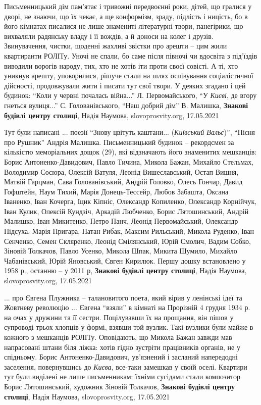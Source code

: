 Письменницький дім пам’ятає і тривожні передвоєнні роки, дітей, що гралися у
дворі, не знаючи, що їх чекає, а ще конформізм, зраду, підлість і ницість, бо в
його кімнатах писалися не лише знамениті літературні твори, панегірики, що
вихваляли радянську владу і її вождів, а й доноси на колег і друзів.
Звинувачення, чистки, щоденні жахливі звістки про арешти – цим жили квартиранти
РОЛІТу. Уночі не спали, бо саме після півночі чи вдосвіта з під’їздів виводили
ворогів народу, тих, хто не хотів іти проти своєї совісті. А ті, хто уникнув
арешту, упокорилися, рішуче стали на шлях оспівування соціалістичної дійсності,
продовжували жити і писати тут свої твори. У деяких згадано і цей будинок:
\enquote{Коли у червні почалась війна...} Л. Первомайського, \enquote{У \emph{Києві}, де
вгору гнеться вулиця...} С. Голованівського, \enquote{Наш добрий дім} В.
Малишка,
\textbf{Знакові будівлі центру столиці}, Надія Наумова, slovoprosvity.org, 17.05.2021

Тут були написані ... поезії \enquote{Знову цвітуть каштани... (\emph{Київський Вальс})},
\enquote{Пісня про Рушник} Андрія Малишка.  Письменницький будинок – рекордсмен
за кількістю меморіальних дощок (29), які відзначають його знаменитих
мешканців: Борис Антоненко-Давидович, Павло Тичина, Микола Бажан, Михайло
Стельмах, Володимир Сосюра, Олексій Ватуля, Леонід Вишеславський, Остап Вишня,
Матвій Гарцман, Сава Голованівський, Андрій Головко, Олесь Гончар, Давид
Гофштейн, Наум Тихий, Марія Донець-Тессейр, Любов Забашта, Оксана Іваненко,
Іван Кочерга, Іцик Кіпніс, Олександр Копиленко, Олександр Корнійчук, Іван
Кулик, Олексій Кундзіч, Аркадій Любченко, Борис Лятошинський, Андрій Малишко,
Іван Микитенко, Петро Панч, Леонід Первомайський, Олександр Підсуха, Марія
Пригара, Натан Рибак, Максим Рильський, Микола Руденко, Іван Сенченко, Семен
Скляренко, Леонід Смілянський, Юрій Смолич, Вадим Собко, Зіновій Толкачов,
Павло Усенко, Микола Шпак, Микита Шумило, Михайло Чабанівський, Юрій Яновський,
Євген Кирилюк. Першу дошку встановлено у 1958 р., останню – у 2011 р,
\textbf{Знакові будівлі центру столиці}, Надія Наумова, slovoprosvity.org, 17.05.2021

... про Євгена Плужника – талановитого поета, який вірив у ленінські ідеї та
Жовтневу революцію ... Євгена \enquote{взяли} в кімнаті на Прорізній 4 грудня
1934 р. на очах у дружини та її сестри. Поцілувавши їх на прощання, він пішов у
супроводі трьох хлопців у формі, взявши той вузлик. Такі вузлики були майже в
кожного з мешканців РОЛІТу.  Оповідають, що Микола Бажан завжди мав напрасовані
штани біля ліжка: хотів гідно зустріти працівників органів, не у спідньому.
Борис Антоненко-Давидович, ув’язнений і засланий напередодні заселення,
повернувшись до \emph{Києва}, все-таки замешкав у своїй оселі. Квартири тут
були виділені не лише письменникам: їхніми сусідами стали композитор Борис
Лятошинський, художник Зіновій Толкачов,
\textbf{Знакові будівлі центру столиці}, Надія Наумова, slovoprosvity.org, 17.05.2021

